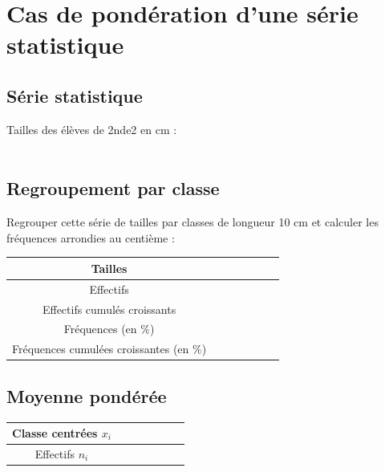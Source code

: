 \section{Cas de pondération d'une série statistique}

\subsection{Série statistique}
Tailles des élèves de 2nde2 en cm : \\[0.6em]
\pointille{\textwidth} \\[0.6em]
\pointille{\textwidth} 




\subsection{Regroupement par classe}

Regrouper cette série de tailles par classes de longueur 10 cm et calculer les fréquences
arrondies au centième :
\begin{center}
\begin{tabular}{|c|c|c|c|c|c|c|}
\hline
Tailles & \phantom{$\dots\dots\dots$} & \phantom{$\dots\dots\dots$} & \phantom{$\dots\dots\dots$} &  \phantom{$\dots\dots\dots$} & \phantom{$\dots\dots\dots$} &\phantom{$\dots\dots\dots$}  \\
\hline
Effectifs &  &  &  &  &  & \\
\hline 
Effectifs cumulés croissants &  &  &  &  &  & \\
\hline 
Fréquences (en $\%$) &  &  &  &  &  &  \\
\hline 
Fréquences cumulées croissantes (en $\%$) &  &  &  &  &  &  \\
\hline 
\end{tabular}
\end{center}


\subsection{Moyenne pondérée}
\begin{center}
\begin{tabular}{|c|c|c|c|c|c|c|}
\hline
Classe centrées $x_i$ & \phantom{$\dots\dots$} & \phantom{$\dots\dots$} & \phantom{$\dots\dots$} & \phantom{$\dots\dots$} & \phantom{$\dots\dots$} &  \phantom{$\dots\dots$}  \\
\hline
Effectifs $n_i$ & \phantom{$\dots\dots$} &\phantom{$\dots\dots$} & \phantom{$\dots\dots$} & \phantom{$\dots\dots$} &\phantom{$\dots\dots$} & \phantom{$\dots\dots$}   \\
\hline

\end{tabular}
\end{center}

